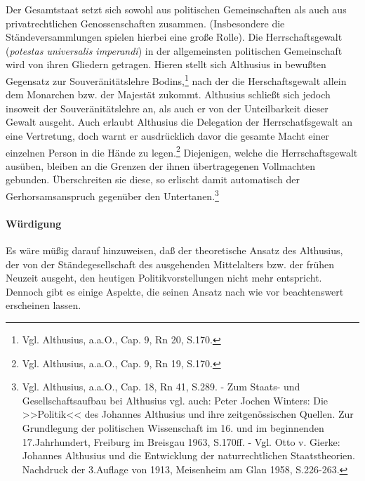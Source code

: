 \documentclass[a4paper,12pt]{article}
\begin{document}
Der Gesamtstaat setzt sich sowohl aus politischen Gemeinschaften
als auch aus privatrechtlichen Genossenschaften zusammen.
(Insbesondere die Ständeversammlungen spielen hierbei eine große
Rolle). Die Herrschaftsgewalt ({\em potestas universalis
imperandi}) in der allgemeinsten politischen Gemeinschaft wird von
ihren Gliedern getragen. Hieren stellt sich Althusius in bewußten
Gegensatz zur Souveränitätslehre Bodins,\footnote{Vgl.
Althusius\cite{althusius}, a.a.O., Cap. 9, Rn 20, S.170.} nach der
die Herschaftsgewalt allein dem Monarchen bzw. der Majestät
zukommt. Althusius schließt sich jedoch insoweit der
Souveränitätslehre an, als auch er von der Unteilbarkeit dieser
Gewalt ausgeht. Auch erlaubt Althusius die Delegation der
Herrschatfsgewalt an eine Vertretung, doch warnt er ausdrücklich
davor die gesamte Macht einer einzelnen Person in die Hände zu
legen.\footnote{Vgl. Althusius\cite{althusius}, a.a.O., Cap. 9, Rn
19, S.170.} Diejenigen, welche die Herrschaftsgewalt ausüben,
bleiben an die Grenzen der ihnen übertragegenen Vollmachten
gebunden. Überschreiten sie diese, so erlischt damit automatisch
der Gerhorsamsanspruch gegenüber den Untertanen.\footnote{Vgl.
Althusius\cite{althusius}, a.a.O., Cap. 18, Rn 41, S.289. - Zum
Staats- und Gesellschaftsaufbau bei Althusius vgl. auch: Peter
Jochen Winters: Die >>Politik<< des Johannes Althusius und ihre
zeitgenössischen Quellen. Zur Grundlegung der politischen
Wissenschaft im 16. und im beginnenden 17.Jahrhundert, Freiburg im
Breisgau 1963, S.170ff. - Vgl.  Otto v. Gierke\cite{gierke}:
Johannes Althusius und die Entwicklung der naturrechtlichen
Staatstheorien. Nachdruck der 3.Auflage von 1913, Meisenheim am
Glan 1958, S.226-263.}

\paragraph{Würdigung}

Es wäre müßig darauf hinzuweisen, daß der theoretische Ansatz des
Althusius, der von der Ständegesellschaft des ausgehenden
Mittelalters bzw. der frühen Neuzeit ausgeht, den heutigen
Politikvorstellungen nicht mehr entspricht.  Dennoch gibt es einige
Aspekte, die seinen Ansatz nach wie vor beachtenswert erscheinen
lassen.
\end{document}
